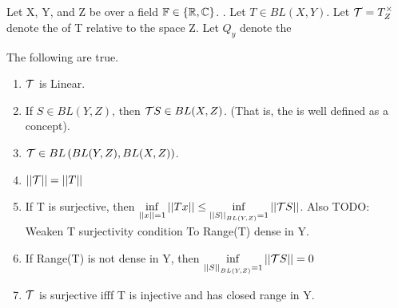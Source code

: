 \begin{prop}[\AdjointOperator]
    \label{prop:adjointoperator}
    Let X, Y, and Z be \SeminormedSpaces
    over a field $\mathbb{F} \in \{\mathbb{R}, \mathbb{C}\}$. .
    Let $T \in BL(X,Y)$. 
    Let $\mathcal{T}=T^\times_Z$ denote the 
    \AdjointOperator of T
    relative to the space Z. 
    Let $Q_y$ denote the \QuotientMap

    The following are true. 
    \begin{enumerate}
        \item $\mathcal{T}$ is Linear. 
        \item If $S \in BL(Y,Z)$, then $\mathcal{T} S \in BL(X,Z)$. (That is, the \AdjointOperator is well defined as a concept).
        \item $\mathcal{T} \in BL\left(  BL(Y,Z), BL(X,Z)\right)$. 
        \item $\left|\left| \mathcal{T} \right|\right|=\left|\left| T \right|\right|$
        \item If T is surjective, then $\inf\limits_{\left|\left| x \right|\right|=1}\left|\left| Tx \right|\right| \leq \inf\limits_{\left|\left| S \right|\right|_{BL(Y,Z)} = 1} \left|\left| \mathcal{T} S \right|\right| $. Also TODO: Weaken T surjectivity condition
				To Range(T) dense in Y. 
		\item If Range(T) is not dense in Y, then $\inf\limits_{\left|\left| S \right|\right|_{BL(Y,Z)}=1} \left|\left| \mathcal{T} S \right|\right| =0$
        \item $\mathcal{T}$ is surjective ifff T is injective and has closed range in Y. 
    \end{enumerate}



\end{prop}
